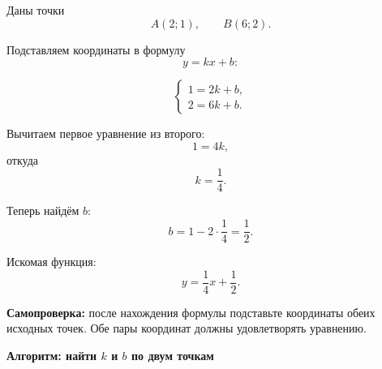 \documentclass[a4paper,12pt]{article}
\begin{document}
Даны точки
\[
    A(2;1),
    \qquad
    B(6;2).
\]

Подставляем координаты в формулу
\[
    y=kx+b:
\]

\[
\begin{cases}
    1=2k+b,\\
    2=6k+b.
\end{cases}
\]

Вычитаем первое уравнение из второго:
\[
    1=4k,
\]
откуда
\[
    k=\frac14.
\]

Теперь найдём $b$:
\[
    b=
    1-2\cdot\frac14
    =
    \frac12.
\]

Искомая функция:
\[
    \boxed{
        y=\frac14x+\frac12
    }.
\]

\textbf{Самопроверка:}
после нахождения формулы подставьте
координаты обеих исходных точек.
Обе пары координат должны удовлетворять уравнению.


\clearpage

\thispagestyle{empty}

\begin{center}

{\Large\bfseries\color{darkaccent}
Алгоритм: найти $k$ и $b$ по двум точкам
}

\end{center}

\vspace{9mm}
\end{document}
